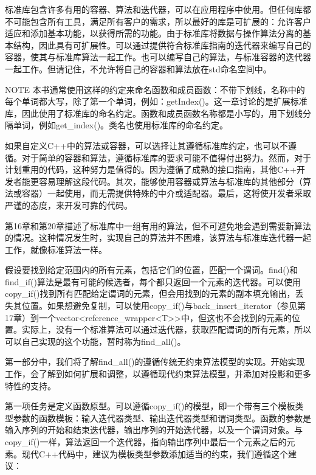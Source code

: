 
标准库包含许多有用的容器、算法和迭代器，可以在应用程序中使用。但任何库都不可能包含所有工具，满足所有客户的需求，所以最好的库是可扩展的：允许客户适应和添加基本功能，以获得所需的功能。由于标准库将数据与操作算法分离的基本结构，因此具有可扩展性。可以通过提供符合标准库指南的迭代器来编写自己的容器，使其与标准库算法一起工作。也可以编写自己的算法，与标准容器的迭代器一起工作。但请记住，不允许将自己的容器和算法放在std命名空间中。

\begin{myNotic}{NOTE}
本书通常使用这样的约定来命名函数和成员函数：不带下划线，名称中的每个单词都大写，除了第一个单词，例如：getIndex()。这一章讨论的是扩展标准库，因此使用了标准库的命名约定。函数和成员函数名称都是小写的，用下划线分隔单词，例如get\_index()。类名也使用标准库的命名约定。
\end{myNotic}


如果自定义C++中的算法或容器，可以选择让其遵循标准库约定，也可以不遵循。对于简单的容器和算法，遵循标准库的要求可能不值得付出努力。然而，对于计划重用的代码，这种努力是值得的。因为遵循了成熟的接口指南，其他C++开发者能更容易理解这段代码。其次，能够使用容器或算法与标准库的其他部分（算法或容器）一起使用，而无需提供特殊的中介或适配器。最后，这将使开发者采取严谨的态度，来开发可靠的代码。


第16章和第20章描述了标准库中一组有用的算法，但不可避免地会遇到需要新算法的情况。这种情况发生时，实现自己的算法并不困难，该算法与标准库迭代器一起工作，就像标准算法一样。


假设要找到给定范围内的所有元素，包括它们的位置，匹配一个谓词。find()和find\_if()算法是最有可能的候选者，每个都只返回一个元素的迭代器。可以使用copy\_if()找到所有匹配给定谓词的元素，但会用找到的元素的副本填充输出，丢失其位置。如果想避免复制，可以使用copy\_if()与back\_insert\_iterator（参见第17章）到一个vector<reference\_wrapper<T>{}>中，但这也不会找到的元素的位置。实际上，没有一个标准算法可以通过迭代器，获取匹配谓词的所有元素，所以可以自己实现的这个功能，暂时称为find\_all()。

第一部分中，我们将了解find\_all()的遵循传统无约束算法模型的实现。开始实现工作，会了解到如何扩展和调整，以遵循现代约束算法模型，并添加对投影和更多特性的支持。

第一项任务是定义函数原型。可以遵循copy\_if()的模型，即一个带有三个模板类型参数的函数模板：输入迭代器类型、输出迭代器类型和谓词类型。函数的参数是输入序列的开始和结束迭代器，输出序列的开始迭代器，以及一个谓词对象。与copy\_if()一样，算法返回一个迭代器，指向输出序列中最后一个元素之后的元素。现代C++代码中，建议为模板类型参数添加适当的约束，我们遵循这个建议：

